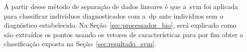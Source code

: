 A partir desse método de separação de dados lineares é que a~\ac{svm} foi aplicada para classificar indivíduos diagnosticados com a~\ac{dp} ante indivíduos sem o diagnóstico estabelecido. Na Seção~\ref{sec:processador_bio}, será explicado como são extraídos os pontos usando os vetores de características para por fim obter a classificação exposta na Seção~\ref{sec:resultado_svm}.







%
%
%
%
%
%
%
%
%

